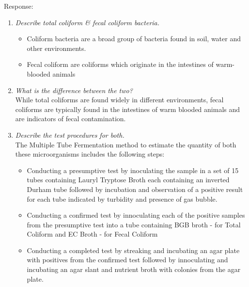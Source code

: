 \begin{enumerate}
Response:\\
\begin{enumerate}[label=\alph*]
\item \textit{Describe total coliform \& fecal coliform bacteria.}
\begin{itemize}
\item Coliform bacteria are a broad group of bacteria found in soil, water and other environments.
\item Fecal coliform are coliforms which originate in the intestines of warm-blooded animals
\end{itemize}
\item \textit{What is the difference between the two? }\\
While total coliforms are found widely in different environments, fecal coliforms are typically found in the intestines of warm blooded animals and are indicators of fecal contamination.
\item \textit{Describe the test procedures for both.}\\
The Multiple Tube Fermentation method to estimate the quantity of both these microorganisms includes the following steps:
\begin{itemize}
\item Conducting a presumptive test by inoculating the sample in a set of 15 tubes containing Lauryl Tryptose Broth each containing an inverted Durham tube followed by incubation and observation of a positive result for each tube indicated by turbidity and presence of gas bubble.
\item Conducting a confirmed test by innoculating each of the positive samples from the presumptive test into a tube containing BGB broth - for Total Coliform and EC Broth - for Fecal Coliform
\item Conducting a completed test by streaking and incubating an agar plate with positives from the confirmed test followed by innoculating and incubating an agar slant and nutrient broth with colonies from the agar plate.



\end{itemize}
\end{enumerate}
\end{enumerate}
